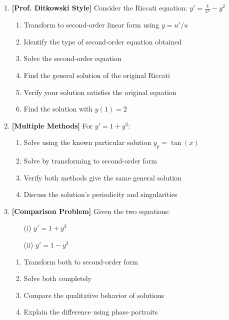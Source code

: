 \documentclass[12pt]{article}
\begin{document}
\begin{enumerate}[resume]
    \item \textbf{[Prof. Ditkowski Style]}
    Consider the Riccati equation: $y' = \frac{4}{x^2} - y^2$
    \begin{enumerate}[label=(\alph*)]
        \item Transform to second-order linear form using $y = u'/u$
        \item Identify the type of second-order equation obtained
        \item Solve the second-order equation
        \item Find the general solution of the original Riccati
        \item Verify your solution satisfies the original equation
        \item Find the solution with $y(1) = 2$
    \end{enumerate}

    \item \textbf{[Multiple Methods]}
    For $y' = 1 + y^2$:
    \begin{enumerate}[label=(\alph*)]
        \item Solve using the known particular solution $y_p = \tan(x)$
        \item Solve by transforming to second-order form
        \item Verify both methods give the same general solution
        \item Discuss the solution's periodicity and singularities
    \end{enumerate}

    \item \textbf{[Comparison Problem]}
    Given the two equations:
    \begin{itemize}
        \item[(i)] $y' = 1 + y^2$
        \item[(ii)] $y' = 1 - y^2$
    \end{itemize}
    \begin{enumerate}[label=(\alph*)]
        \item Transform both to second-order form
        \item Solve both completely
        \item Compare the qualitative behavior of solutions
        \item Explain the difference using phase portraits
    \end{enumerate}


\end{enumerate}
\end{document}

